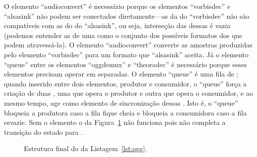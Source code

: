 \documentclass{SBCbookchapter}
\begin{document}
O elemento ``audioconvert'' é necessário porque os elementos ``vorbisdec'' e
``alsasink'' não podem ser conectados diretamente---as  da
 do ``vorbisdec'' não são compatíveis com as  do
 do ``alsasink'', ou seja, interseção das  dessas
 é vazia (podemos entender as  de uma  como o
conjunto dos possíveis formatos dos  que podem atravessá-la).
O elemento ``audioconvert'' converte as amostras produzidas pelo elemento
``vorbisdec'' para um formato que ``alsasink'' aceita.  Já o elemento
``queue'' entre os elementos ``oggdemux'' e ``theoradec'' é necessário
porque esses elementos precisam operar em  separadas.
O elemento ``queue'' é uma fila de ; quando inserido entre dois
elementos, produtor e consumidor, o ``queue'' força a criação de duas
, uma que opera o produtor e outra que opera o
consumidor, e ao mesmo tempo, age como elemento de sincronização dessas
.  Isto é, o ``queue'' bloqueia a  produtora caso a
fila fique cheia e bloqueia a  consumidora caso a fila esvazie.
Sem o elemento  o  da Figura~\ref{fig:pipe-ogg} não
funciona pois não completa a transição do estado  para
.

\begin{figure}[H]
  \centering
  \caption{Estrutura final do  da Listagem~\ref{lst:ogg}.}
  \label{fig:pipe-ogg}
\end{figure}
\end{document}
